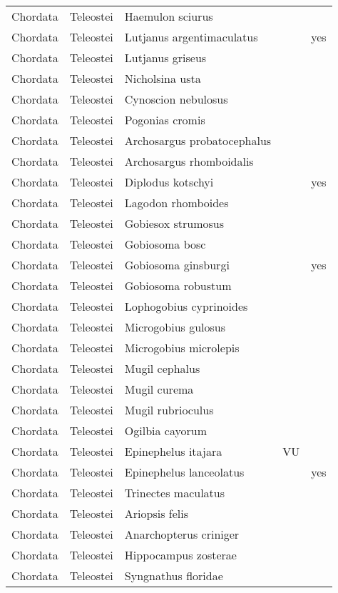 \begin{longtable}{lllll}
  Chordata & Teleostei & Haemulon sciurus &  &  \\ 
  Chordata & Teleostei & Lutjanus argentimaculatus &  & yes \\ 
  Chordata & Teleostei & Lutjanus griseus &  &  \\ 
  Chordata & Teleostei & Nicholsina usta &  &  \\ 
  Chordata & Teleostei & Cynoscion nebulosus &  &  \\ 
  Chordata & Teleostei & Pogonias cromis &  &  \\ 
  Chordata & Teleostei & Archosargus probatocephalus &  &  \\ 
  Chordata & Teleostei & Archosargus rhomboidalis &  &  \\ 
  Chordata & Teleostei & Diplodus kotschyi &  & yes \\ 
  Chordata & Teleostei & Lagodon rhomboides &  &  \\ 
  Chordata & Teleostei & Gobiesox strumosus &  &  \\ 
  Chordata & Teleostei & Gobiosoma bosc &  &  \\ 
  Chordata & Teleostei & Gobiosoma ginsburgi &  & yes \\ 
  Chordata & Teleostei & Gobiosoma robustum &  &  \\ 
  Chordata & Teleostei & Lophogobius cyprinoides &  &  \\ 
  Chordata & Teleostei & Microgobius gulosus &  &  \\ 
  Chordata & Teleostei & Microgobius microlepis &  &  \\ 
  Chordata & Teleostei & Mugil cephalus &  &  \\ 
  Chordata & Teleostei & Mugil curema &  &  \\ 
  Chordata & Teleostei & Mugil rubrioculus &  &  \\ 
  Chordata & Teleostei & Ogilbia cayorum &  &  \\ 
  Chordata & Teleostei & Epinephelus itajara & VU &  \\ 
  Chordata & Teleostei & Epinephelus lanceolatus &  & yes \\ 
  Chordata & Teleostei & Trinectes maculatus &  &  \\ 
  Chordata & Teleostei & Ariopsis felis &  &  \\ 
  Chordata & Teleostei & Anarchopterus criniger &  &  \\ 
  Chordata & Teleostei & Hippocampus zosterae &  &  \\ 
  Chordata & Teleostei & Syngnathus floridae &  &  \\ 

\end{longtable}
